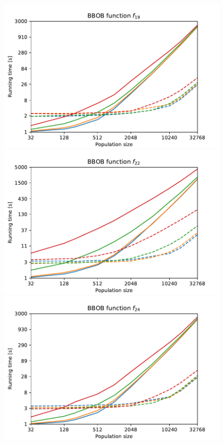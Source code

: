 \begin{figure}[ht!]
\begin{minipage}[t]{0.32\textwidth}
    \end{minipage}

    \begin{minipage}[t]{0.32\textwidth}
        \centering
        \includegraphics[width=\textwidth]{img/runs/time_pso2011_fn19_alldim.pdf}
    \end{minipage}
    \hfill
    \begin{minipage}[t]{0.32\textwidth}
        \centering
        \includegraphics[width=\textwidth]{img/runs/time_pso2011_fn22_alldim.pdf}
    \end{minipage}
    \hfill
    \begin{minipage}[t]{0.32\textwidth}
        \centering
        \includegraphics[width=\textwidth]{img/runs/time_pso2011_fn24_alldim.pdf}

\end{minipage}
\end{figure}
